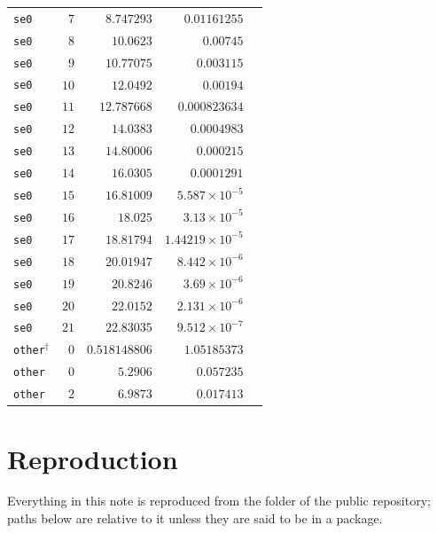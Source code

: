\documentclass[11pt,a4paper]{article}
\numberwithin{equation}{section}
\newcommand{\file}[1]{\path{#1}}
\newcommand{\sci}[2]{#1\times10^{#2}}
\begin{document}
{\begin{longtable}{@{}lrrrr@{}}
\texttt{se0} & $7$ & $8.747293$ & $0.01161255$ & \\
\texttt{se0} & $8$ & $10.0623$ & $0.00745$ & \\
\texttt{se0} & $9$ & $10.77075$ & $0.003115$ & \\
\texttt{se0} & $10$ & $12.0492$ & $0.00194$ & \\
\texttt{se0} & $11$ & $12.787668$ & $0.000823634$ & \\
\texttt{se0} & $12$ & $14.0383$ & $0.0004983$ & \\
\texttt{se0} & $13$ & $14.80006$ & $0.000215$ & \\
\texttt{se0} & $14$ & $16.0305$ & $0.0001291$ & \\
\texttt{se0} & $15$ & $16.81009$ & $\sci{5.587}{-5}$ & \\
\texttt{se0} & $16$ & $18.025$ & $\sci{3.13}{-5}$ & \\
\texttt{se0} & $17$ & $18.81794$ & $\sci{1.44219}{-5}$ & \\
\texttt{se0} & $18$ & $20.01947$ & $\sci{8.442}{-6}$ & \\
\texttt{se0} & $19$ & $20.8246$ & $\sci{3.69}{-6}$ & \\
\texttt{se0} & $20$ & $22.0152$ & $\sci{2.131}{-6}$ & \\
\texttt{se0} & $21$ & $22.83035$ & $\sci{9.512}{-7}$ & \\
\texttt{other}$^\dagger$ & $0$ & $0.518148806$ & $1.05185373$ & \\
\texttt{other} & $0$ & $5.2906$ & $0.057235$ & \\
\texttt{other} & $2$ & $6.9873$ & $0.017413$ & \\
\end{longtable}
}

\section{Reproduction}\label{app:repro}
Everything in this note is reproduced from the folder \file{SRI/} of the public repository; paths below are relative
to it unless they are said to be in a package.
\end{document}
